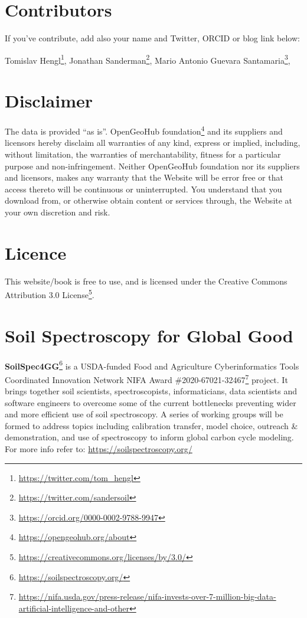 \documentclass[
  graybox,natbib,nospthms]{svmono}
\renewcommand{\href}[2]{#2 (\url{#1})}
\renewcommand{\href}[2]{#2\footnote{\url{#1}}}
\begin{document}
\hypertarget{contributors}{%
\section{Contributors}\label{contributors}}

If you've contribute, add also your name and Twitter, ORCID or blog link
below:

\href{https://twitter.com/tom_hengl}{Tomislav Hengl}, \href{https://twitter.com/sandersoil}{Jonathan Sanderman}, \href{https://orcid.org/0000-0002-9788-9947}{Mario Antonio Guevara
Santamaria},

\hypertarget{disclaimer}{%
\section{Disclaimer}\label{disclaimer}}

The data is provided ``as is''. \href{https://opengeohub.org/about}{OpenGeoHub foundation} and its suppliers and licensors hereby disclaim all warranties of any kind, express or implied, including, without limitation, the warranties of merchantability, fitness for a particular purpose and non-infringement. Neither OpenGeoHub foundation nor its suppliers and licensors, makes any warranty that the Website will be error free or that access thereto will be continuous or uninterrupted. You understand that you download from, or otherwise obtain content or services through, the Website at your own discretion and risk.

\hypertarget{licence}{%
\section{Licence}\label{licence}}

This website/book is free to use, and is licensed under the \href{https://creativecommons.org/licenses/by/3.0/}{Creative
Commons Attribution 3.0
License}.

\hypertarget{soil-spectroscopy-for-global-good}{%
\section{Soil Spectroscopy for Global Good}\label{soil-spectroscopy-for-global-good}}

\href{https://soilspectroscopy.org/}{\textbf{SoilSpec4GG}} is a USDA-funded \href{https://nifa.usda.gov/press-release/nifa-invests-over-7-million-big-data-artificial-intelligence-and-other}{Food and Agriculture Cyberinformatics
Tools Coordinated Innovation Network NIFA Award \#2020-67021-32467} project. It brings together soil
scientists, spectroscopists, informaticians, data scientists and
software engineers to overcome some of the current bottlenecks
preventing wider and more efficient use of soil spectroscopy. A series
of working groups will be formed to address topics including calibration
transfer, model choice, outreach \& demonstration, and use of
spectroscopy to inform global carbon cycle modeling. For more info refer
to: \url{https://soilspectroscopy.org/}
\end{document}
